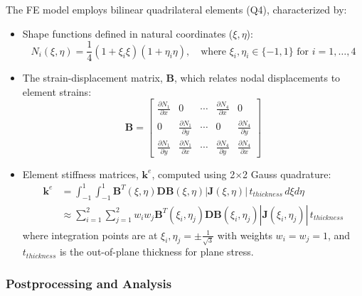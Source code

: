 \documentclass{article}
\begin{document}
The FE model employs bilinear quadrilateral elements (Q4), characterized by:
\begin{itemize}
  \item Shape functions defined in natural coordinates ($\xi,\eta$):
        \[
          N_i(\xi,\eta) = \frac{1}{4}(1+\xi_i\xi)(1+\eta_i\eta), \quad \text{where } \xi_i,\eta_i \in \{-1,1\} \text{ for } i=1, \dots, 4
        \]
  \item The strain-displacement matrix, $\mathbf{B}$, which relates nodal displacements to element strains:
        \[
          \mathbf{B} = \begin{bmatrix}
            \frac{\partial N_1}{\partial x} & 0                               & \cdots & \frac{\partial N_4}{\partial x} & 0                               \\
            0                               & \frac{\partial N_1}{\partial y} & \cdots & 0                               & \frac{\partial N_4}{\partial y} \\
            \frac{\partial N_1}{\partial y} & \frac{\partial N_1}{\partial x} & \cdots & \frac{\partial N_4}{\partial y} & \frac{\partial N_4}{\partial x}
          \end{bmatrix}
        \]
  \item Element stiffness matrices, $\mathbf{k}^e$, computed using 2$\times$2 Gauss quadrature:
        \begin{align*}
          \mathbf{k}^e & = \int_{-1}^{1}\int_{-1}^{1} \mathbf{B}^T(\xi,\eta)\mathbf{D}\mathbf{B}(\xi,\eta)|\mathbf{J}(\xi,\eta)| \, t_{thickness} \, d\xi d\eta             \\
                       & \approx \sum_{i=1}^{2}\sum_{j=1}^{2} w_iw_j\mathbf{B}^T(\xi_i,\eta_j)\mathbf{D}\mathbf{B}(\xi_i,\eta_j)|\mathbf{J}(\xi_i,\eta_j)| \, t_{thickness}
        \end{align*}
        where integration points are at $\xi_i,\eta_j = \pm\frac{1}{\sqrt{3}}$ with weights $w_i=w_j=1$, and $t_{thickness}$ is the out-of-plane thickness for plane stress.
\end{itemize}

\subsubsection{Postprocessing and Analysis}
\end{document}
